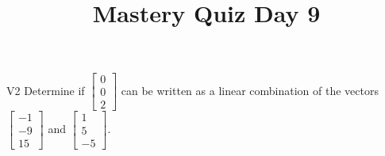 \documentclass{sbgLAquiz}
\title{Mastery Quiz Day 9 }
\begin{document}
\begin{problem}{V2}
Determine if  $\begin{bmatrix} 0 \\ 0 \\ 2 \end{bmatrix}$ can be written as a linear combination of the vectors $\begin{bmatrix} -1 \\ -9 \\ 15 \end{bmatrix}$ and $\begin{bmatrix} 1 \\ 5 \\ -5 \end{bmatrix}$.
\end{problem}
\end{document}
